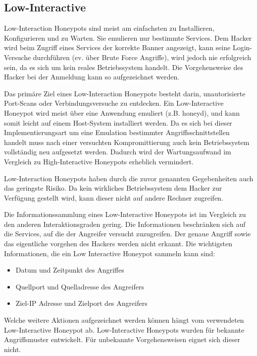 \subsection{Low-Interactive}
Low-Interaction Honeypots sind meist am einfachsten zu Installieren, Konfigurieren und zu Warten. Sie emulieren nur bestimmte Services. Dem Hacker wird beim Zugriff eines Services der korrekte Banner angezeigt, kann seine Login-Versuche durchführen (ev. über Brute Force Angriffe), wird jedoch nie erfolgreich sein, da es sich um kein reales Betriebssystem handelt. Die Vorgehensweise des Hacker bei der Anmeldung kann so aufgezeichnet werden. 

Das primäre Ziel eines Low-Interaction Honeypots besteht darin, unautorisierte Port-Scans oder Verbindungsversuche zu entdecken. Ein Low-Interactive Honeypot wird meist über eine Anwendung emuliert (z.B. honeyd), und kann somit leicht auf einem Host-System installiert werden. Da es sich bei dieser Implementierungsart um eine Emulation bestimmter Angriffsschnittstellen handelt muss nach einer versuchten Kompromittierung auch kein Betriebssystem vollständig neu aufgesetzt werden. Dadurch wird der Wartungsaufwand im Vergleich zu High-Interactive Honeypots erheblich vermindert.

Low-Interaction Honeypots haben durch die zuvor genannten Gegebenheiten auch das geringste Risiko. Da kein wirkliches Betriebssystem dem Hacker zur Verfügung gestellt wird, kann dieser nicht auf andere Rechner zugreifen. 

Die Informationssammlung eines Low-Interactive Honeypots ist im Vergleich zu den anderen Interaktionsgraden gering. Die Informationen beschränken sich auf die Services, auf die der Angreifer versucht zuzugreifen. Der genaue Angriff sowie das eigentliche vorgehen des Hackers werden nicht erkannt. Die wichtigsten Informationen, die ein Low Interactive Honeypot sammeln kann sind\cite{spitzner.2002a}:

\begin{itemize}
\item Datum und Zeitpunkt des Angriffes
\item Quellport und Quelladresse des Angreifers
\item Ziel-IP Adresse und Zielport des Angreifers
\end{itemize}

\noindent Welche weitere Aktionen aufgezeichnet werden können hängt vom verwendeten Low-Interactive Honeypot ab.
Low-Interactive Honeypots wurden für bekannte Angriffsmuster entwickelt. Für unbekannte Vorgehensweisen eignet sich dieser nicht. 



